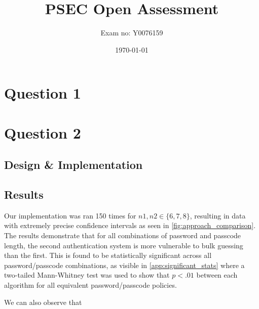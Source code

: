 \documentclass[british,10pt,a4paper]{article}
\begin{document}
\title{PSEC Open Assessment}
\author{Exam no: Y0076159}
\date{\today}
\maketitle
\tableofcontents
\clearpage
\section{Question 1}
\subsection{}

\section{Question 2}
\subsection{Design \& Implementation}

\subsection{Results}
Our implementation was ran 150 times for $n1, n2 \in \{6,7,8\}$, resulting in data with extremely precise confidence intervals as seen in \autoref{fig:approach_comparison}. The results demonstrate that for all combinations of password and passcode length, the second authentication system is more vulnerable to bulk guessing than the first. This is found to be statistically significant across all password/passcode combinations, as visible in \autoref{app:significant_stats} where a two-tailed Mann-Whitney test was used to show that $p<.01$ between each algorithm for all equivalent password/passcode policies. \newline 

We can also observe that 
\end{document}
